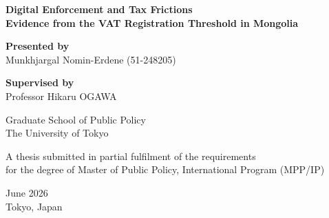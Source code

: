 \documentclass[12pt,oneside,a4paper]{report}
\begin{document}
\begin{titlepage}
    \begin{center}
        \vspace*{2cm}

        {\Large \bfseries Digital Enforcement and Tax Frictions}\\ [0.3cm]
        {\large \textbf{Evidence from the VAT Registration Threshold in Mongolia} }

        \vspace{2.5cm}

        {\large \textbf{Presented by}}\\[0.3cm]
        {\large Munkhjargal Nomin-Erdene (51-248205)}

        \vspace{2cm}

        {\large \textbf{Supervised by}}\\[0.3cm]
        {\large Professor Hikaru OGAWA}

        \vspace{2.5cm}

        {\large Graduate School of Public Policy\\
        The University of Tokyo}

        \vfill

        {\large A thesis submitted in partial fulfilment of the requirements\\
        for the degree of Master of Public Policy, International Program (MPP/IP)}

        \vspace{2cm}

        {\large June 2026\\
        Tokyo, Japan}

    \end{center}
\end{titlepage}

\begin{abstract}
This study examines the effect of Mongolia's 2016 ebarimt program, an electronic receipt system designed to strengthen VAT enforcement in business-to-consumer (B2C) transactions. Introduced alongside an increase in the VAT registration threshold from MNT 10 million to MNT 50 million, the program rewarded consumers for registering purchases and created an independent audit trail for retail sales. To identify its effect, I combine a polynomial counterfactual bunching estimator with a difference-in-differences design using binned corporate income tax data covering 2014 to 2023. Threshold bunching declined substantially more in consumer-facing sectors than in business-to-business (B2B) sectors after the reform. The B2C--B2B differential widened over several years rather than appearing in full at the reform date, consistent with the gradual uptake of a new monitoring technology. The evidence suggests that consumer-side digital auditing can narrow the B2C enforcement gap that has long constrained VAT collection in low-capacity tax administrations.
\end{abstract}
\end{document}
